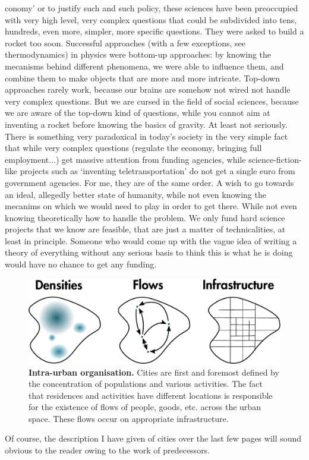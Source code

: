 conomy' or to justify such and such policy, these sciences have been preoccupied
with very high level, very complex questions that could be subdivided into tens,
hundreds, even more, simpler, more specific questions. They were asked to build
a rocket too soon. Successful approaches (with a few exceptions, see
thermodynamics) in physics were bottom-up approaches: by knowing the mecanisms
behind different phenomena, we were able to influence them, and combine them to
make objects that are more and more intricate. Top-down approaches rarely work,
because our brains are somehow not wired not handle very complex questions. But
we are cursed in the field of social sciences, because we are aware of the
top-down kind of questions, while you cannot aim at inventing a rocket before
knowing the basics of gravity. At least not seriously. There is something very
paradoxical in today's society in the very simple fact that while very complex
questions (regulate the economy, bringing full employment...) get massive
attention from funding agencies, while science-fiction-like projects such as
`inventing teletransportation' do not get a single euro from government
agencies. For me, they are of the same order. A wish to go towards an ideal,
allegedly better state of humanity, while not even knowing the mecanims on which
we would need to play in order to get there. While not even knowing
theoretically how to handle the problem. We only fund hard science projects that
we know are feasible, that are just a matter of technicalities, at least in
principle. Someone who would come up with the vague idea of writing a theory of
everything without any serious basis to think this is what he is doing would
have no chance to get any funding.\\


\begin{figure}
    \centering
    \includegraphics[width=1\textwidth]{gfx/chapter-intro/intra-urban.pdf}
    \caption{{\bf Intra-urban organisation.} Cities are first and foremost defined by
    the concentration of populations and various activities. The fact that
residences and activities have different locations is responsible for the
existence of flows of people, goods, etc. across the urban space. These flows
occur on appropriate infrastructure.\label{fig:intr_urban}}
\end{figure}

Of course, the description I have given of cities over the last few pages will
sound obvious to the reader owing to the work of predecessors.

